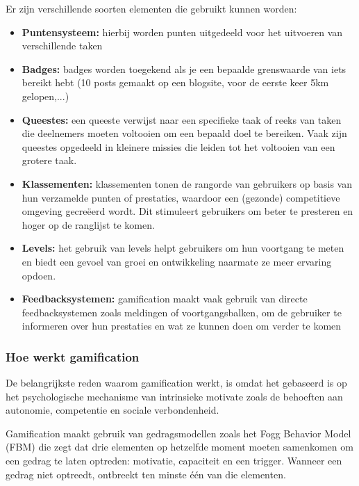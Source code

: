 \documentclass{hogent-article}
\begin{document}
Er zijn verschillende soorten elementen die gebruikt kunnen worden:
\begin{itemize}
    \item \textbf{Puntensysteem:} hierbij worden punten uitgedeeld voor het uitvoeren van verschillende taken \autocite{Kondrat2024}
    \item  \textbf{Badges:} badges worden toegekend als je een bepaalde grenswaarde van iets bereikt hebt (10 posts gemaakt op een blogsite, voor de eerste keer 5km gelopen,...) \autocite{Kondrat2024}
    \item \textbf{Queestes:} een queeste verwijst naar een specifieke taak of reeks van taken die deelnemers moeten voltooien om een bepaald doel te bereiken. Vaak zijn queestes  opgedeeld in kleinere missies die leiden tot het voltooien van een grotere taak. \autocite{Wanasek2023}
    \item \textbf{Klassementen:} klassementen tonen de rangorde van gebruikers op basis van hun verzamelde punten of prestaties, waardoor een (gezonde) competitieve omgeving gecreëerd wordt. Dit stimuleert gebruikers om beter te presteren en hoger op de ranglijst te komen. \autocite{Werbach2012}
    \item \textbf{Levels:} het gebruik van levels helpt gebruikers om hun voortgang te meten en biedt een gevoel van groei en ontwikkeling naarmate ze meer ervaring opdoen. \autocite{Werbach2012}
    \item \textbf{Feedbacksystemen:} gamification maakt vaak gebruik van directe feedbacksystemen zoals meldingen of voortgangsbalken, om de gebruiker te informeren over hun prestaties en wat ze kunnen doen om verder te komen \autocite{Deterding2011}
\end{itemize}

\subsubsection{Hoe werkt gamification}

De belangrijkste reden waarom gamification werkt, is omdat het gebaseerd is op het psychologische mechanisme van intrinsieke motivate zoals de behoeften aan autonomie, competentie en sociale verbondenheid. \autocite{Ryan2000}

Gamification maakt gebruik van gedragsmodellen zoals het Fogg Behavior Model (FBM) die zegt dat drie elementen op hetzelfde moment moeten samenkomen om een ​​gedrag te laten optreden: motivatie, capaciteit en een trigger. Wanneer een gedrag niet optreedt, ontbreekt ten minste één van die elementen. \autocite{Fogg_2009}
\end{document}
